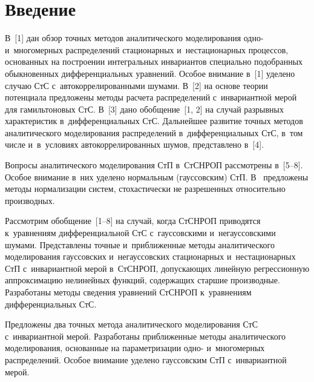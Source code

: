 
  
\vspace*{2pt}



\thispagestyle{headings}

\begin{multicols}{2}

\label{st\stat}


\section{Введение}


В~[1] дан обзор точных методов аналитического моделирования одно- и~многомерных распределений стационарных и~нестационарных процессов, 
основанных на построении интегральных инвариантов специально подобранных обыкновенных дифференциальных уравнений. Особое внимание в~[1] 
уделено случаю СтС с~автокоррелированными шумами. В~[2] на основе теории потенциала предложены методы расчета 
распределений с~инвариантной мерой для гамильтоновых СтС. В~[3] дано обобщение~[1, 2] на случай разрывных характеристик в~дифференциальных СтС. 
Дальнейшее развитие точных методов аналитического моделирования распределений в~дифференциальных СтС, в~том числе  и~в~условиях 
автокоррелированных шумов, представлено в~[4].

Вопросы аналитического моделирования СтП в~СтСНРОП рас\-смот\-ре\-ны в~[5--8]. 
Особое внимание в~них уделено нормальным (гауссовским) СтП. В~\cite{9-sin} предложены методы нормализации сис\-тем, стохастически не разрешенных 
относительно производных.

Рассмотрим обобщение~[1--8] на случай, когда СтСНРОП приводятся к~уравнениям дифференциальной СтС с~гауссовскими и~негауссовскими шумами.
%
Представлены точные и~приближенные методы аналитического моделирования гауссовских и~негауссовских стационарных и~нестационарных СтП с~инвариантной
 мерой в~СтСНРОП, до\-пус\-ка\-ющих линейную регрессионную аппроксимацию нелинейных функций, содержащих старшие производные. Разработаны методы 
 сведения уравнений СтСНРОП к~уравнениям дифференциальных СтС. %
 
 Предложены два точных метода аналитического %
  моделирования СтС с~инвариантной мерой. 
 Разработаны приближенные методы аналитического моделирования, основанные на параметризации одно- и~многомерных распределений. Особое внимание уделено
  гауссовским СтП с~инвариантной мерой. 
  

\end{multicols}

